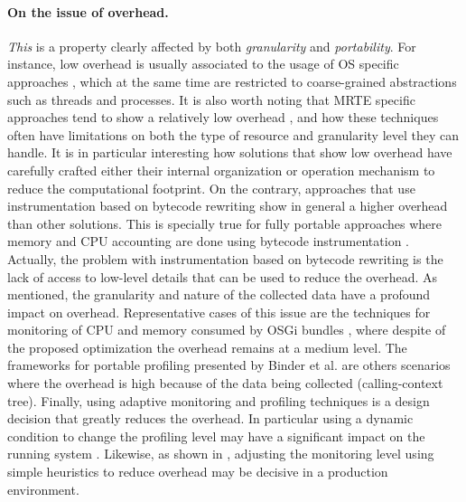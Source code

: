 \paragraph{On the issue of overhead.}
\textit{This} is a property clearly affected by both \textit{granularity} and \textit{portability}.
For instance, low overhead is usually associated to the usage of OS specific approaches \cite{Banga:1999:RCN:296806.296810, DBLP:conf/pppj/PeternierBBP11, Soltesz:2007:COS:1272998.1273025, Kamp00jails:confining}, which at the same time are restricted to coarse-grained abstractions such as threads and processes.
It is also worth noting that MRTE specific approaches tend to show a relatively low overhead \cite{Price:2003:GCM:829515.830545,dsn/09/geoffray/ijvm, Dmitriev:2004:PJA:974043.974067, citeulike:481405, Attouchi:2014:MMM:2602458.2602467, back_processes_2000, czajkowski_multitasking_2001}, and how these techniques often have limitations on both the type of resource and granularity level they can handle.
It is in particular interesting how solutions that show low overhead have carefully crafted  either their internal organization \cite{back_processes_2000, czajkowski_multitasking_2001} or operation mechanism \cite{Dmitriev:2004:PJA:974043.974067, citeulike:481405} to reduce the computational footprint.
On the contrary, approaches that use instrumentation based on bytecode rewriting show in general a higher overhead than other solutions.
This is specially true for fully portable approaches where memory and CPU accounting are done using bytecode instrumentation \cite{czajkowski_jres:_1998, Hulaas:2004:PTP:1014007.1014024,Hulaas:2008:PTL,binder_portable_2001, Binder200657,Hulaas:2008:PTL}.
Actually, the problem with instrumentation based on bytecode rewriting is the lack of access to low-level details that can be used to reduce the overhead.
As mentioned, the granularity and nature of the collected data have a profound impact on overhead.
Representative cases of this issue are the techniques for monitoring of CPU and memory consumed by OSGi bundles \cite{Maurel:2012:AME:2304736.2304763, Attouchi:2014:MMM:2602458.2602467}, where despite of the proposed optimization the overhead remains at a medium level.
The frameworks for portable profiling presented by Binder et al. \cite{Binder200645, Binder:2009:PPV:1464245.1464249} are others scenarios where the overhead is high because of the data being collected (calling-context tree).
Finally, using adaptive monitoring and profiling techniques is a design decision that greatly reduces the overhead.
In particular using a dynamic condition to change the profiling level may have a significant impact on the running system \cite{Dmitriev:2004:PJA:974043.974067, citeulike:481405}.
Likewise, as shown in \cite{Maurel:2012:AME:2304736.2304763}, adjusting the monitoring level using simple heuristics to reduce overhead may be decisive in a production environment.

